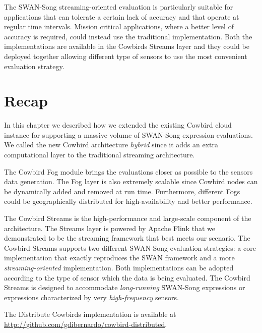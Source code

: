 The SWAN-Song streaming-oriented evaluation is particularly suitable for applications that can tolerate a certain lack of accuracy and that operate at regular time intervals. Mission critical applications, where a better level of accuracy is required, could instead use the traditional implementation. Both the implementations are available in the Cowbirds Streams layer and they could be deployed together allowing different type of sensors to use the most convenient evaluation strategy.

\section{Recap}
In this chapter we described how we extended the existing Cowbird cloud instance for supporting a massive volume of SWAN-Song expression evaluations. We called the new Cowbird architecture \emph{hybrid} since it adds an extra computational layer to the traditional streaming architecture.

The Cowbird Fog module brings the evaluations closer as possible to the sensors data generation. The Fog layer is also extremely scalable since Cowbird nodes can be dynamically added and removed at run time. Furthermore, different Fogs could be geographically distributed for high-availability and better performance. 

The Cowbird Streams is the high-performance and large-scale component of the architecture. The Streams layer is powered by Apache Flink that we demonstrated to be the streaming framework that best meets our scenario. The Cowbird Streams supports two different SWAN-Song evaluation strategies: a core implementation that exactly reproduces the SWAN framework and a more \emph{streaming-oriented} implementation. Both implementations can be adopted according to the type of sensor  which the data is being evaluated. The Cowbird Streams is designed to accommodate \emph{long-running} SWAN-Song expressions or expressions characterized by very \emph{high-frequency} sensors. 

The Distribute Cowbirds implementation is available at \url{http://github.com/gdibernardo/cowbird-distributed}.


